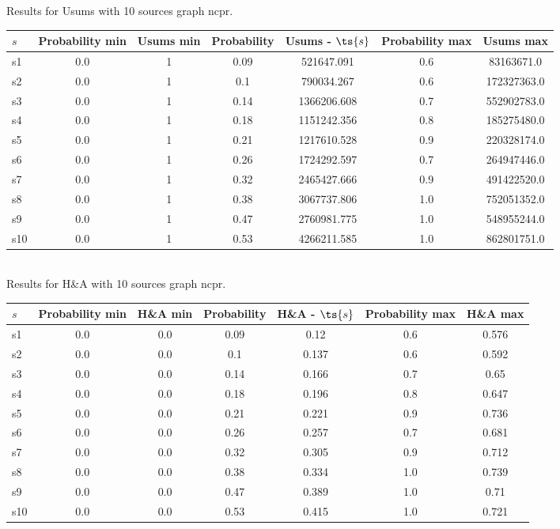 \documentclass{article}
\begin{document}
\noindent Results for Usums with 10 sources graph ncpr.

\noindent\begin{tabular}{|l|c|c|c|c|c|c|}
\hline
$s$& Probability min & Usums min & Probability & Usums - $\ts{s}$ & Probability max & Usums max\\
\hline
s1 &0.0 & 1 & 0.09 & 521647.091 & 0.6 & 83163671.0\\
\hline
s2 &0.0 & 1 & 0.1 & 790034.267 & 0.6 & 172327363.0\\
\hline
s3 &0.0 & 1 & 0.14 & 1366206.608 & 0.7 & 552902783.0\\
\hline
s4 &0.0 & 1 & 0.18 & 1151242.356 & 0.8 & 185275480.0\\
\hline
s5 &0.0 & 1 & 0.21 & 1217610.528 & 0.9 & 220328174.0\\
\hline
s6 &0.0 & 1 & 0.26 & 1724292.597 & 0.7 & 264947446.0\\
\hline
s7 &0.0 & 1 & 0.32 & 2465427.666 & 0.9 & 491422520.0\\
\hline
s8 &0.0 & 1 & 0.38 & 3067737.806 & 1.0 & 752051352.0\\
\hline
s9 &0.0 & 1 & 0.47 & 2760981.775 & 1.0 & 548955244.0\\
\hline
s10 &0.0 & 1 & 0.53 & 4266211.585 & 1.0 & 862801751.0\\
\hline
\end{tabular}\\

\noindent Results for H\&A with 10 sources graph ncpr.

\noindent\begin{tabular}{|l|c|c|c|c|c|c|}
\hline
$s$& Probability min & H\&A min & Probability & H\&A - $\ts{s}$ & Probability max & H\&A max\\
\hline
s1 &0.0 & 0.0 & 0.09 & 0.12 & 0.6 & 0.576\\
\hline
s2 &0.0 & 0.0 & 0.1 & 0.137 & 0.6 & 0.592\\
\hline
s3 &0.0 & 0.0 & 0.14 & 0.166 & 0.7 & 0.65\\
\hline
s4 &0.0 & 0.0 & 0.18 & 0.196 & 0.8 & 0.647\\
\hline
s5 &0.0 & 0.0 & 0.21 & 0.221 & 0.9 & 0.736\\
\hline
s6 &0.0 & 0.0 & 0.26 & 0.257 & 0.7 & 0.681\\
\hline
s7 &0.0 & 0.0 & 0.32 & 0.305 & 0.9 & 0.712\\
\hline
s8 &0.0 & 0.0 & 0.38 & 0.334 & 1.0 & 0.739\\
\hline
s9 &0.0 & 0.0 & 0.47 & 0.389 & 1.0 & 0.71\\
\hline
s10 &0.0 & 0.0 & 0.53 & 0.415 & 1.0 & 0.721\\
\hline
\end{tabular}\\
\end{document}

